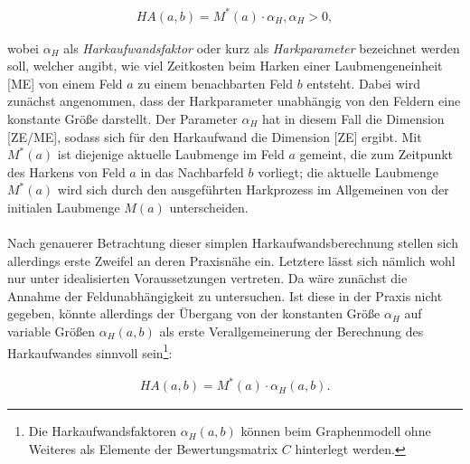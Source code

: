 \documentclass[fontsize=12pt,doubleside,openany,listof=totoc,listof=flat,listof=nochaptergap,numbers=noenddot]{scrbook}
\theoremstyle{style}
\begin{document}
\begin{align}
HA(a,b) = M^*(a)\cdot \alpha_H, \alpha_H>0,
\label{Harkaufwandsformel_1}
\end{align}

\noindent wobei $\alpha_H$ als \textit{Harkaufwandsfaktor}\label{Harkaufwandsfaktor} oder kurz als \textit{Harkparameter}\label{Harkparameter} bezeichnet werden soll, welcher angibt, wie viel
Zeitkosten beim Harken einer Laubmengeneinheit [ME] von einem Feld $a$ zu 
einem benachbarten Feld $b$ entsteht. Dabei wird zunächst angenommen, dass der 
Harkparameter unabhängig von den Feldern eine konstante Größe darstellt. 
Der Parameter $\alpha_H$ hat in diesem Fall die Dimension [ZE/ME], sodass 
sich für den Harkaufwand die Dimension [ZE] ergibt. Mit $M^*(a)$ ist diejenige aktuelle Laubmenge\label{aktuelle Laubmenge} im Feld $a$ gemeint, die zum Zeitpunkt des Harkens von Feld $a$ in das Nachbarfeld $b$ vorliegt; die aktuelle Laubmenge $M^*(a)$ wird sich durch den ausgeführten Harkprozess im Allgemeinen von der initialen Laubmenge $M(a)$ unterscheiden.
\\ \\
Nach genauerer Betrachtung dieser simplen Harkaufwandsberechnung stellen 
sich allerdings erste Zweifel an deren Praxisnähe ein. Letztere lässt sich 
nämlich wohl nur unter idealisierten Voraussetzungen vertreten. Da wäre 
zunächst die Annahme der Feldunabhängigkeit zu untersuchen. Ist diese in 
der Praxis nicht gegeben, könnte allerdings der Übergang von der konstanten 
Größe $\alpha_H$ auf variable Größen $\alpha_H(a,b)$ als erste 
Verallgemeinerung der Berechnung des Harkaufwandes sinnvoll sein\footnote{Die Harkaufwandsfaktoren $\alpha_H(a,b)$ können beim Graphenmodell ohne Weiteres als Elemente der Bewertungsmatrix $C$ hinterlegt werden.}:

\begin{align}
HA(a,b) = M^*(a) \cdot \alpha_H(a,b).\label{Harkaufwandsformel_2}
\end{align}	
\end{document}
